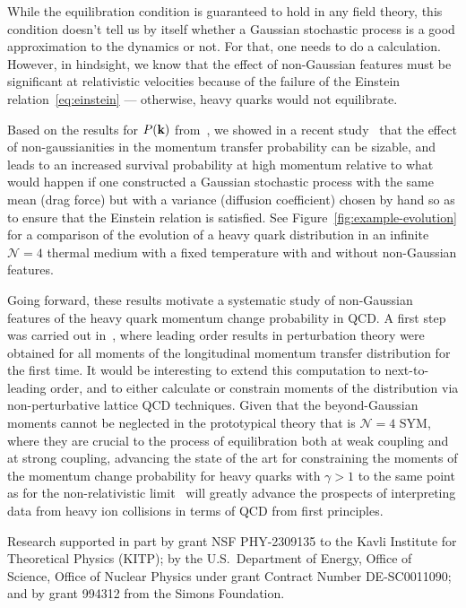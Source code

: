 \documentclass[final,3p,times]{elsarticle}
\begin{document}
While the equilibration condition is guaranteed to hold in any field theory, this condition doesn't tell us by itself whether a Gaussian stochastic process is a good approximation to the dynamics or not. For that, one needs to do a calculation. However, in hindsight, we know that the effect of non-Gaussian features must be significant at relativistic velocities because of the failure of the Einstein relation~\eqref{eq:einstein} --- otherwise, heavy quarks would not equilibrate.

Based on the results for $P({\bf k})$ from~\cite{Rajagopal:2025ukd}, we showed in a recent study~\cite{Rajagopal:2026urq} that the effect of non-gaussianities in the momentum transfer probability can be sizable, and leads to an increased survival probability at high momentum relative to what would happen if one constructed a Gaussian stochastic process with the same mean (drag force) but with a variance (diffusion coefficient) chosen by hand so as to ensure that the Einstein relation is satisfied. See Figure~\ref{fig:example-evolution} for a comparison of the evolution of a heavy quark distribution in an infinite $\mathcal{N}=4$ thermal medium with a fixed temperature with and without non-Gaussian features.

Going forward, these results motivate a systematic study of non-Gaussian features of the heavy quark momentum change probability in QCD. A first step was carried out in~\cite{DuPlessis:2026pyr}, where leading order results in perturbation theory were obtained for all moments of the longitudinal momentum transfer distribution for the first time. It would be interesting to extend this computation to next-to-leading order, and to either calculate or constrain moments of the distribution via non-perturbative lattice QCD techniques.
Given that the beyond-Gaussian moments cannot be neglected in the prototypical theory that is $\mathcal{N}=4$ SYM, where they are crucial to the process of equilibration both at weak coupling and at strong coupling, advancing the state of the art for constraining the moments of the momentum change probability for heavy quarks with $\gamma > 1$ to the same point as for the non-relativistic limit~\cite{HotQCD:2025fbd} will greatly advance the prospects of interpreting data from heavy ion collisions in terms of QCD from first principles.

\vspace{0.5cm}

{\footnotesize
Research supported in part by grant NSF PHY-2309135 to the Kavli Institute for Theoretical Physics (KITP); by the U.S.~Department of Energy, Office of Science, Office of Nuclear Physics under grant Contract Number DE-SC0011090; and by grant 994312 from the Simons Foundation.}
\end{document}

